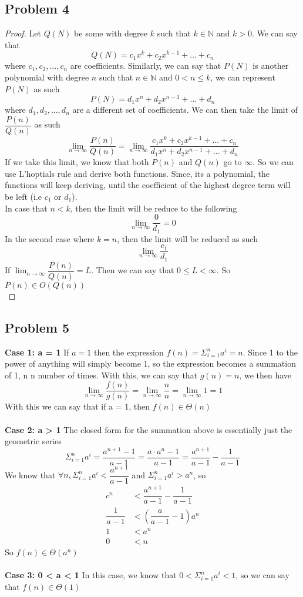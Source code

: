 \documentclass[12pt]{article}
\newcommand{\N}{\mathbb{N}}
\begin{document}
\subsection*{Problem 4}
\begin{proof}
Let $Q(N)$ be some with degree $k$ such that $k \in \N$ and $k >0$. We can say that
\[ Q(N) = c_1x^{k} + c_2x^{k-1} + ... + c_n \]
where $c_1, c_2,..., c_n$ are coefficients. Similarly, we can say that $P(N)$ is another polynomial with degree $n$ such that $n \in \N$ and $0<n\leq k$, we can represent $P(N)$ as such
\[ P(N) = d_1x^{n} + d_2x^{n -1} + ... + d_n \]
where $d_1, d_2, ..., d_n$ are a different set of coefficients. We can then take the limit of $\dfrac{P(n)}{Q(n)}$ as such
\[ \lim_{n \rightarrow \infty} \dfrac{P(n)}{Q(n)} = \lim_{n \rightarrow \infty} \dfrac{c_1x^{k} + c_2x^{k-1} + ... + c_n}{d_1x^{n} + d_2x^{n -1} + ... + d_n} \]
If we take this limit, we know that both $P(n)$ and $Q(n)$ go to $\infty$. So we can use L'hoptials rule and derive both functions. Since, its a polynomial, the functions will keep deriving, until the coefficient of the highest degree term will be left (i.e $c_1$ or $d_1$).\\
In case that $n < k$, then the limit will be reduce to the following
\[ \lim_{n \rightarrow \infty} \dfrac{0}{d_1} = 0 \]
In the second case where $k = n$, then the limit will be reduced as such
\[ \lim_{n \rightarrow \infty} \dfrac{c_1}{d_1} \]
If $ \lim_{n \rightarrow \infty} \dfrac{P(n)}{Q(n)} = L$. Then we can say that $0\leq L < \infty$. So $P(n) \in O(Q(n))$\\
\end{proof}
\newpage
\subsection*{Problem 5}
\textbf{Case 1: a = 1} If $a = 1$ then the expression $f(n)= \Sigma^{n}_{i=1}a^i = n$. Since 1 to the power of anything will simply become 1, so the expression becomes a summation of 1, n n number of times. With this, we can say that $g(n) = n$, we then have 
\[ \lim_{n \rightarrow \infty}\dfrac{f(n)}{g(n)} = \lim_{n \rightarrow \infty} \dfrac{n}{n} =\lim_{n \rightarrow \infty} 1 = 1\]
With this we can say that if a = 1, then $f(n) \in \Theta (n)$\\\\
\textbf{Case 2: a > 1} The closed form for the summation above is essentially just the geometric series
\[ \Sigma^{n}_{i=1} a^i = \dfrac{a^{n+1} - 1}{a - 1} = \dfrac{a \cdot a^n - 1}{a - 1} = \dfrac{a^{n+1}}{a-1} - \dfrac{1}{a-1} \]
We know that $\forall n ,\Sigma^{n}_{i=1} a^i < \dfrac{a^{n+1}}{a-1}$ and $\Sigma^{n}_{i=1} a^i > a^n$, so
\begin{align*}
c^n &< \dfrac{a^{n+1}}{a-1} - \dfrac{1}{a-1} \\
\dfrac{1}{a-1} &< \left( \dfrac{a}{a-1} -1 \right)a^n \\
1 &< a^n\\
0 &< n
\end{align*}
So $f(n) \in \Theta(a^n)$
\\\\
\textbf{Case 3: 0 < a < 1}
In this case, we know that $0 < \Sigma^{n}_{i=1} a^i < 1$, so we can say that $f(n) \in \Theta(1)$
\end{document}
